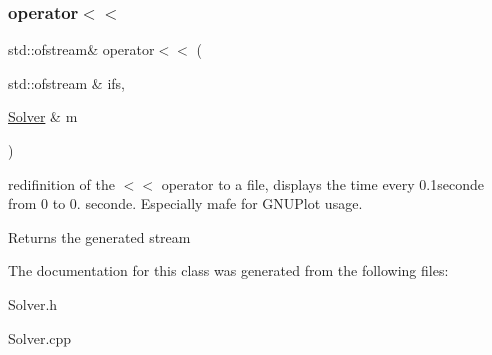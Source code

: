 \subsubsection{\texorpdfstring{operator$<$$<$}{operator<<}\hspace{0.1cm}{\footnotesize\ttfamily [2/2]}}
{\footnotesize\ttfamily std\+::ofstream\& operator$<$$<$ (\begin{DoxyParamCaption}\item[{std\+::ofstream \&}]{ifs,  }\item[{\mbox{\hyperlink{classSolver}{Solver}} \&}]{m }\end{DoxyParamCaption})\hspace{0.3cm}{\ttfamily [friend]}}

redifinition of the $<$$<$ operator to a file, displays the time every 0.\+1seconde from 0 to 0. seconde. Especially mafe for G\+N\+U\+Plot usage. \begin{DoxyReturn}{Returns}
the generated stream 
\end{DoxyReturn}


The documentation for this class was generated from the following files\+:\begin{DoxyCompactItemize}
\item 
Solver.\+h\item 
Solver.\+cpp\end{DoxyCompactItemize}
